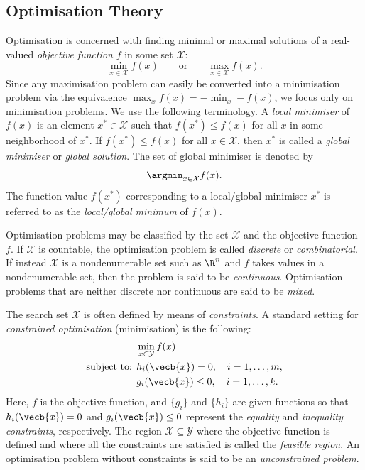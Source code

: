 \subsection{Optimisation Theory} \label{sec:OptimisationTheory}
Optimisation is concerned with finding minimal or maximal solutions of a real-valued \textit{objective function} $f$ in some set $\mathcal{X}$:
\begin{equation}
	\min_{x \in \mathcal{X}} f(x) \qquad \text{or} \qquad \max_{x \in \mathcal{X}} f(x). \label{eq:OptimizationDef}
\end{equation}
Since any maximisation problem can easily be converted into a minimisation problem via the equivalence $\max_x f(x) = -\min_x -f(x)$, we focus only on minimisation problems. We use the following terminology. A \textit{local minimiser} of $f(x)$ is an element $x^* \in \mathcal{X}$ such that $f(x^*) \le f(x)$ for all $x$ in some neighborhood of $x^*$. If $f(x^*) \le f(x)$ for all $x \in \mathcal{X}$, then $x^*$ is called a \textit{global minimiser} or \textit{global solution}. The set of global minimiser is denoted by
\begin{equation*}
	\argmin_{x \in \mathcal{X}} f(x).
\end{equation*}
The function value $f(x^*)$ corresponding to a local/global minimiser $x^*$ is referred to as the \textit{local/global minimum} of $f(x)$.

Optimisation problems may be classified by the set $\mathcal{X}$ and the objective function $f$. If $\mathcal{X}$ is countable, the optimisation problem is called \textit{discrete} or \textit{combinatorial}. If instead $\mathcal{X}$ is a nondenumerable set such as $\R^n$ and $f$ takes values in a nondenumerable set, then the problem is said to be \textit{continuous}. Optimisation problems that are neither discrete nor continuous are said to be \textit{mixed}.

The search set $\mathcal{X}$ is often defined by means of \textit{constraints}. A standard setting for \textit{constrained optimisation} (minimisation) is the following:
\begin{equation}
	\begin{split}
		                    & \min_{x \in \mathcal{Y}} f(x)               \\
		\text{subject to: } & h_i(\vecb{x}) = 0, \quad i = 1, \dots, m,   \\
		                    & g_i(\vecb{x}) \le 0, \quad i = 1, \dots, k.
	\end{split} \label{eq:ConstrainedOptimization}
\end{equation}
Here, $f$ is the objective function, and $\{g_i\}$ and $\{h_i\}$ are given functions so that $h_i(\vecb{x}) = 0$ and $g_i(\vecb{x}) \le 0$ represent the \textit{equality} and \textit{inequality constraints}, respectively. The region $\mathcal{X} \subseteq \mathcal{Y}$ where the objective function is defined and where all the constraints are satisfied is called the \textit{feasible region}. An optimisation problem without constraints is said to be an \textit{unconstrained problem}.

